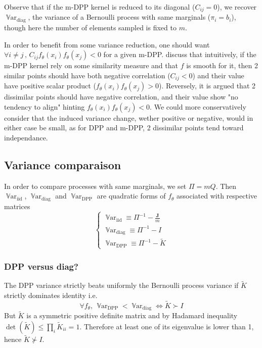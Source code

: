 \documentclass{article} %
\newcommand{\Var}{\operatorname{\mathbb V ar}}
\newcommand{\1}{\mathds{1}} %
\newcommand{\moones}{\boldsymbol{J}} %
\theoremstyle{definition} %
\begin{document}
Observe that if the m-DPP kernel is reduced to its diagonal ($C_{ij} = 0$), we recover $\Var_{\textrm{diag}}$, the variance of a Bernoulli process with same marginals ($\pi_i = b_i$), though here the number of elements sampled is fixed to $m$.

In order to benefit from some variance reduction, one should want $\forall i\neq j \,,\, C_{ij}f_\theta(x_i) f_\theta(x_j) <0$ for a given m-DPP.
\cite{zhang2017dppminibatch} discuss that intuitively, if the m-DPP kernel rely on some similarity measure and that $f$ is smooth for it, then 2 similar points should have both negative correlation ($C_{ij}<0$) and their value have positive scalar product ($f_\theta(x_i) f_\theta(x_j) > 0$). Reversely, it is argued that 2 dissimilar points should have negative correlation, and their value show "no tendency to align" hinting $f_\theta(x_i) f_\theta(x_j) < 0$. We could more conservatively consider that the induced variance change, wether positive or negative, would in either case be small, as for DPP and m-DPP, 2 dissimilar points tend toward independance.




\subsection[]{Variance comparaison}
In order to compare processes with same marginals, we set $\Pi = mQ$. Then $\Var_{\textrm{iid}}$, $\Var_{\textrm{diag}}$ and $\Var_{\textrm{DPP}}$ are quadratic forms of $f_\theta$ associated with respective matrices
$$\begin{cases}
	\Var_{\textrm{iid}} \equiv \Pi^{-1} - \frac{\moones}{m} \\
	\Var_{\textrm{diag}} \equiv \Pi^{-1} - I \\
	\Var_{\textrm{DPP}} \equiv \Pi^{-1} - \tilde K
\end{cases}$$

\subsubsection{DPP versus diag?}
The DPP variance strictly beats uniformly the Bernoulli process variance if $\tilde K$ strictly dominates identity i.e. 
\begin{equation}
	\forall f_\theta, \, \Var_{\textrm{DPP}} < \Var_{\textrm{diag}} \iff \tilde K \succ I
\end{equation}
But $\tilde K$ is a symmetric positive definite matrix and by Hadamard inequality $\det( \tilde K) \leq \prod_{i} \tilde K_{ii}= 1$. Therefore at least one of its eigenvalue is lower than 1, hence $\tilde K \nsucc I$.
\end{document}
